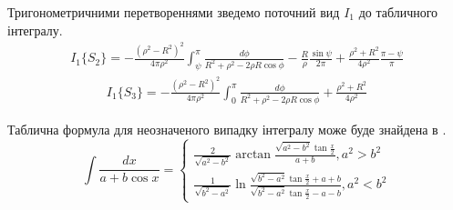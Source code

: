 Тригонометричними перетвореннями зведемо поточний вид $ I_1 $ до табличного 
інтегралу.
%
\begin{equation*} \begin{aligned}
I_{1} \{ S_2 \} = - \frac{\left( \rho^2 - R^2 \right)^2}{4 \pi \rho^2} 
\int_{\psi}^{\pi} \frac{d \phi}{R^2 + \rho^2 - 2 \rho R \cos \phi} - 
\frac{R}{\rho} \frac{\sin \psi}{2 \pi} +  
\frac{\rho^2 + R^2}{4 \rho^2} \frac{\pi - \psi}{\pi}
\end{aligned} \end{equation*}
%
%
\begin{equation*} \begin{aligned}
I_{1} \{ S_3 \} = - \frac{\left( \rho^2 - R^2 \right)^2}{4 \pi \rho^2} 
\int_{0}^{\pi} \frac{d \phi}{R^2 + \rho^2 - 2 \rho R \cos \phi} + 
\frac{\rho^2 + R^2}{4 \rho^2}
\end{aligned} \end{equation*}

Таблична формула для неозначеного випадку інтегралу може буде знайдена в 
\cite[ст. 181]{imp:ElementFunc1983}.
%
\begin{equation} \label{eq:caseTableIntegral}
\int \frac{d x}{a + b \cos{x}} = \begin{cases}
\frac{2}{\sqrt{a^2-b^2}} \arctan \frac{\sqrt{a^2-b^2} \tan \frac{x}{2}}
{a + b}, a^2 > b^2 \\
\frac{1}{\sqrt{b^2-a^2}} \ln 
\frac{\sqrt{b^2-a^2} \tan \frac{x}{2} + a + b}
{\sqrt{b^2-a^2} \tan \frac{x}{2} - a - b}, a^2 < b^2
\end{cases}
\end{equation}

